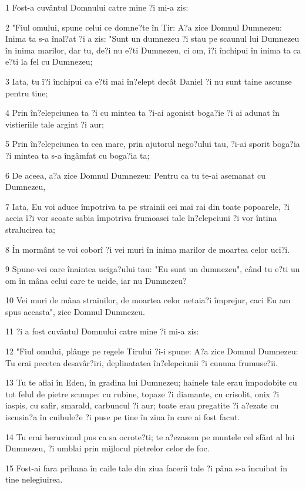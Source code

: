 \par 1 Fost-a cuvântul Domnului catre mine ?i mi-a zis:
\par 2 "Fiul omului, spune celui ce domne?te în Tir: A?a zice Domnul Dumnezeu: Inima ta s-a înal?at ?i a zis: "Sunt un dumnezeu ?i stau pe scaunul lui Dumnezeu în inima marilor, dar tu, de?i nu e?ti Dumnezeu, ci om, î?i închipui în inima ta ca e?ti la fel cu Dumnezeu;
\par 3 Iata, tu î?i închipui ca e?ti mai în?elept decât Daniel ?i nu sunt taine ascunse pentru tine;
\par 4 Prin în?elepciunea ta ?i cu mintea ta ?i-ai agonisit boga?ie ?i ai adunat în vistieriile tale argint ?i aur;
\par 5 Prin în?elepciunea ta cea mare, prin ajutorul nego?ului tau, ?i-ai sporit boga?ia ?i mintea ta s-a îngâmfat cu boga?ia ta;
\par 6 De aceea, a?a zice Domnul Dumnezeu: Pentru ca tu te-ai asemanat cu Dumnezeu,
\par 7 Iata, Eu voi aduce împotriva ta pe strainii cei mai rai din toate popoarele, ?i aceia î?i vor scoate sabia împotriva frumoasei tale în?elepciuni ?i vor întina stralucirea ta;
\par 8 În mormânt te voi coborî ?i vei muri în inima marilor de moartea celor uci?i.
\par 9 Spune-vei oare înaintea uciga?ului tau: "Eu sunt un dumnezeu", când tu e?ti un om în mâna celui care te ucide, iar nu Dumnezeu?
\par 10 Vei muri de mâna strainilor, de moartea celor netaia?i împrejur, caci Eu am spus aceasta", zice Domnul Dumnezeu.
\par 11 ?i a fost cuvântul Domnului catre mine ?i mi-a zis:
\par 12 "Fiul omului, plânge pe regele Tirului ?i-i spune: A?a zice Domnul Dumnezeu: Tu erai pecetea desavâr?iri, deplinatatea în?elepciunii ?i cununa frumuse?ii.
\par 13 Tu te aflai în Eden, în gradina lui Dumnezeu; hainele tale erau împodobite cu tot felul de pietre scumpe: cu rubine, topaze ?i diamante, cu crisolit, onix ?i iaspis, cu safir, smarald, carbuncul ?i aur; toate erau pregatite ?i a?ezate cu iscusin?a în cuibule?e ?i puse pe tine în ziua în care ai fost facut.
\par 14 Tu erai heruvimul pus ca sa ocrote?ti; te a?ezasem pe muntele cel sfânt al lui Dumnezeu, ?i umblai prin mijlocul pietrelor celor de foc.
\par 15 Fost-ai fara prihana în caile tale din ziua facerii tale ?i pâna s-a încuibat în tine nelegiuirea.
